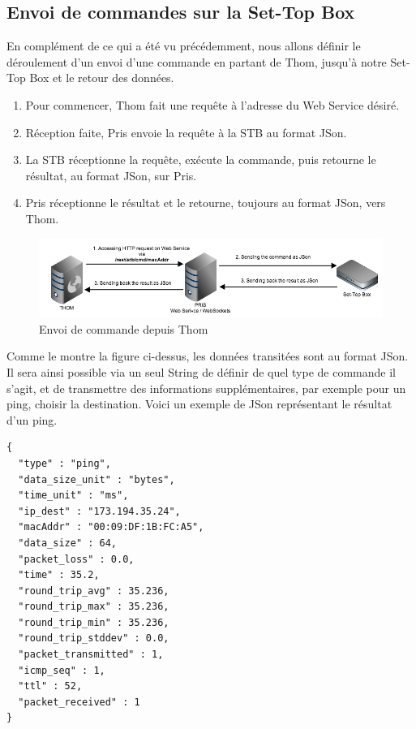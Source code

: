 \subsection{Envoi de commandes sur la Set-Top Box}

En complément de ce qui a été vu précédemment, nous allons définir le déroulement d'un envoi d'une commande en partant de Thom, jusqu'à notre Set-Top Box et le retour des données.

\medskip

\begin{enumerate}
	\item Pour commencer, Thom fait une requête à l'adresse du Web Service désiré.
	\item Réception faite, Pris envoie la requête à la STB au format JSon.
	\item La STB réceptionne la requête, exécute la commande, puis retourne le résultat, au format JSon, sur Pris.
	\item Pris réceptionne le résultat et le retourne, toujours au format JSon, vers Thom.
\end{enumerate}

\begin{figure}[H]
      \centering
      \includegraphics[width=\textwidth]{00_media/sending_cmd}
      \caption{Envoi de commande depuis Thom}
      \label{gra:maqmenu}
\end{figure}

\medskip

Comme le montre la figure ci-dessus, les données transitées sont au format JSon. Il sera ainsi possible via un seul String de définir de quel type de commande il s'agit, et de transmettre des informations supplémentaires, par exemple pour un ping, choisir la destination. Voici un exemple de JSon représentant le résultat d'un ping.

\begin{lstlisting}[caption={Résultat au format JSon}]
{
  "type" : "ping",
  "data_size_unit" : "bytes",
  "time_unit" : "ms",
  "ip_dest" : "173.194.35.24",
  "macAddr" : "00:09:DF:1B:FC:A5",
  "data_size" : 64,
  "packet_loss" : 0.0,
  "time" : 35.2,
  "round_trip_avg" : 35.236,
  "round_trip_max" : 35.236,
  "round_trip_min" : 35.236,
  "round_trip_stddev" : 0.0,
  "packet_transmitted" : 1,
  "icmp_seq" : 1,
  "ttl" : 52,
  "packet_received" : 1
}

\end{lstlisting}

